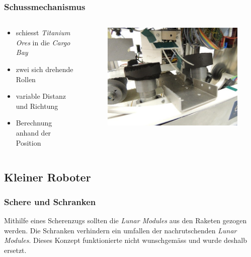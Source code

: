 \begin{frame}
	\frametitle{Schussmechanismus}
		\begin{columns}
		\begin{column}{0.42 \textwidth}
			\begin{itemize}
				\item schiesst \textit{Titanium Ores} in die \textit{Cargo Bay}
				\item zwei sich drehende Rollen
				\item variable Distanz und Richtung
				\item Berechnung anhand der Position
			\end{itemize}
		\end{column}
		\begin{column}{0.58 \textwidth}
			\vspace{-2.8em}
			\begin{figure}[h]
				\centering
				\includegraphics[width = 1 \textwidth]{../images/presentation/schussmechanismus.jpg}
			\end{figure}
		\end{column}
	\end{columns}
\end{frame}

\subsection{Kleiner Roboter}

\begin{frame}
	\frametitle{Schere und Schranken}
	Mithilfe eines Scherenzugs sollten die \textit{Lunar Modules} aus den Raketen gezogen werden.
	Die Schranken verhindern ein umfallen der nachrutschenden \textit{Lunar Modules}.
	Dieses Konzept funktionierte nicht wunschgemäss und wurde deshalb ersetzt.	
\end{frame}

